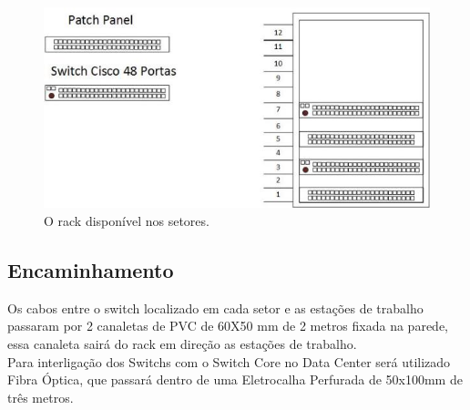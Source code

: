 \documentclass[	DIV=calc,%
							paper=a4,%
							fontsize=12pt,%
							onecolumn]{scrartcl}	 					%
\begin{document}
\begin{figure}
	\centering
	\includegraphics[]{fig11}
	\caption{O rack disponível nos setores. }
	\label{fig11}
\end{figure} 
\subsection{Encaminhamento}
Os cabos entre o switch localizado em cada setor e as estações de trabalho passaram por 2 canaletas de PVC de 60X50 mm de 2 metros fixada na parede, essa canaleta sairá do rack em direção as estações de trabalho.\\
Para interligação dos Switchs com o Switch Core no Data Center será utilizado Fibra Óptica, que passará dentro de uma Eletrocalha Perfurada de 50x100mm de três metros.
\\
\\
\\
\\
\\
\\
\\
\\
\\
\\
\\
\\
\\
\\
\\
\\
\\
\\
\\
\\
\\
\\
\\
\\
\\
\\
\\
\end{document}
